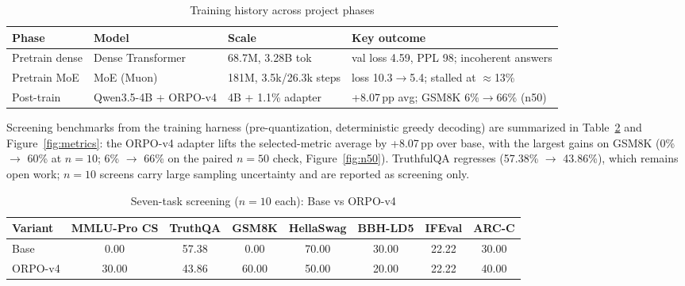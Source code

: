 \documentclass[12pt,a4paper]{report}
\begin{document}
\begin{table}[h]
    \centering
    \begin{tabular}{lllp{6cm}}
        \toprule
        Phase & Model & Scale & Key outcome \\
        \midrule
        Pretrain dense & Dense Transformer & 68.7M, 3.28B tok & val loss 4.59, PPL 98; incoherent answers \\
        Pretrain MoE & MoE (Muon) & 181M, 3.5k/26.3k steps & loss 10.3$\rightarrow$5.4; stalled at $\approx$13\% \\
        Post-train & Qwen3.5-4B + ORPO-v4 & 4B + 1.1\% adapter & +8.07\,pp avg; GSM8K 6\%$\rightarrow$66\% (n50) \\
        \bottomrule
    \end{tabular}
    \caption{Training history across project phases}
    \label{tab:history}
\end{table}

Screening benchmarks from the training harness (pre-quantization,
deterministic greedy decoding) are summarized in Table~\ref{tab:metrics}
and Figure~\ref{fig:metrics}: the ORPO-v4 adapter lifts the
selected-metric average by +8.07\,pp over base, with the largest gains
on GSM8K (0\% $\rightarrow$ 60\% at $n{=}10$; 6\% $\rightarrow$ 66\% on
the paired $n{=}50$ check, Figure~\ref{fig:n50}). TruthfulQA regresses
(57.38\% $\rightarrow$ 43.86\%), which remains open work; $n{=}10$
screens carry large sampling uncertainty and are reported as screening
only.

\begin{table}[h]
    \centering
    \begin{tabular}{lccccccc}
        \toprule
        Variant & MMLU-Pro CS & TruthQA & GSM8K & HellaSwag & BBH-LD5 & IFEval & ARC-C \\
        \midrule
        Base & 0.00 & 57.38 & 0.00 & 70.00 & 30.00 & 22.22 & 30.00 \\
        ORPO-v4 & 30.00 & 43.86 & 60.00 & 50.00 & 20.00 & 22.22 & 40.00 \\
        \bottomrule
    \end{tabular}
    \caption{Seven-task screening ($n{=}10$ each): Base vs ORPO-v4} 
    \label{tab:metrics}
\end{table}
\end{document}
